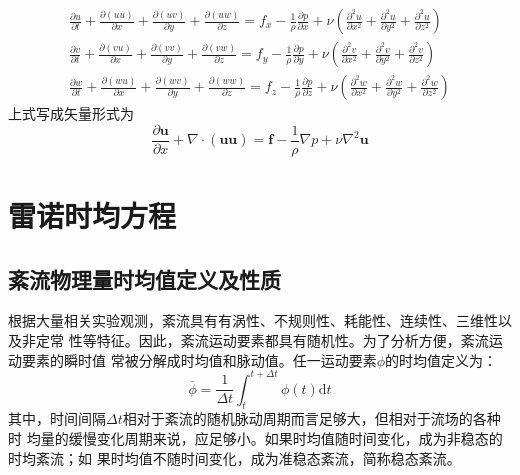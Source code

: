 \begin{subequations}
  \begin{align}
    \frac{\partial u}{\partial t}
    +
    \frac{\partial (uu)}{\partial x}
    +
    \frac{\partial (uv)}{\partial y}
    +
    \frac{\partial (uw)}{\partial z}
    =
    f_{x}
    -\frac{1}{\rho}\frac{\partial p}{\partial x}
    +
    \nu
    \left(
      \frac{\partial^{2} u}{\partial x^{2}} +
      \frac{\partial^{2} u}{\partial y^{2}} +
      \frac{\partial^{2} u}{\partial z^{2}}
    \right)
    \label{EqCGe_NS_Me_x}
    \\
    \frac{\partial v}{\partial t}
    +
    \frac{\partial (vu)}{\partial x}
    +
    \frac{\partial (vv)}{\partial y}
    +
    \frac{\partial (vw)}{\partial z}
    =
    f_{y}
    -\frac{1}{\rho}\frac{\partial p}{\partial y}
    +
    \nu
    \left(
      \frac{\partial^{2} v}{\partial x^{2}} +
      \frac{\partial^{2} v}{\partial y^{2}} +
      \frac{\partial^{2} v}{\partial z^{2}}
    \right)
    \\
    \frac{\partial w}{\partial t}
    +
    \frac{\partial (wu)}{\partial x}
    +
    \frac{\partial (wv)}{\partial y}
    +
    \frac{\partial (ww)}{\partial z}
    =
    f_{z}
    -\frac{1}{\rho}\frac{\partial p}{\partial z}
    +
    \nu
    \left(
      \frac{\partial^{2} w}{\partial x^{2}} +
      \frac{\partial^{2} w}{\partial y^{2}} +
      \frac{\partial^{2} w}{\partial z^{2}}
    \right)
  \end{align}
  \label{EqCGe_NS_Me}
\end{subequations}
上式写成矢量形式为
\begin{equation}
  \frac{\partial \mathbf{u}}{\partial x} +
  \nabla\cdot(\mathbf{u}\mathbf{u})
  =
  \mathbf{f} -
  \frac{1}{\rho}\nabla p +
  \nu\nabla^{2}\mathbf{u}
\end{equation}


\section{雷诺时均方程}
\subsection{紊流物理量时均值定义及性质}
根据大量相关实验观测，紊流具有有涡性、不规则性、耗能性、连续性、三维性以及非定常
性等特征。因此，紊流运动要素都具有随机性。为了分析方便，紊流运动要素的瞬时值
常被分解成时均值和脉动值。任一运动要素$\phi$的时均值定义为：
\begin{equation}
  \overline{\phi}
  =
  \frac{1}{\Delta t}
  \int_{t}^{t+\Delta t}\!
  \phi(t)
  \mathrm{d}t
  \label{EqCGe_RA}
\end{equation}
其中，时间间隔$\Delta t$相对于紊流的随机脉动周期而言足够大，但相对于流场的各种时
均量的缓慢变化周期来说，应足够小。如果时均值随时间变化，成为非稳态的时均紊流；如
果时均值不随时间变化，成为准稳态紊流，简称稳态紊流。

